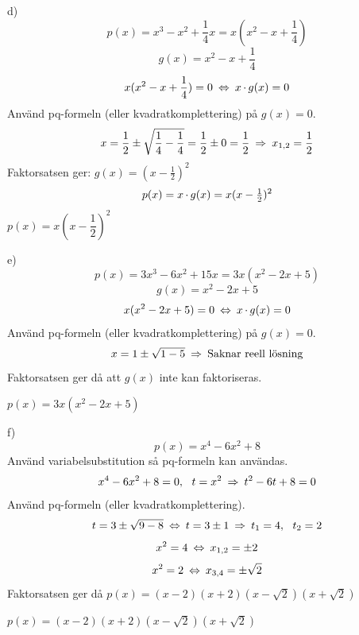 \begin{task}{d)}
	\[p(x)=x^3-x^2+\frac{1}{4}x=x\left(x^2-x+\frac{1}{4}\right)\]
	\[g(x)=x^2-x+\frac{1}{4}\]
	\[x(x^2-x+\frac{1}{4})=0 \lra x\*g(x)=0\]
	Använd pq-formeln (eller kvadratkomplettering) på $g(x)=0$.
	\[x=\frac{1}{2}\pm\sqrt{\frac{1}{4}-\frac{1}{4}}=
	\frac{1}{2}\pm 0=
	\frac{1}{2}
	\ra x_{1,2}=\frac{1}{2}\]
	Faktorsatsen ger: $g(x)=(x-\frac{1}{2})^2$
	\[p(x)=x\operatorname{\cdot}g(x)=x(x-\tfrac{1}{2})^2\]
	\ans $p(x)=x\left(x-\dfrac{1}{2}\right)^2$
\end{task}

\begin{task}{e)}
	\[p(x)=3x^3-6x^2+15x=3x(x^2-2x+5)\]
	\[g(x)=x^2-2x+5\]
	\[x(x^2-2x+5)=0 \lra x\*g(x)=0\]
	Använd pq-formeln (eller kvadratkomplettering) på $g(x)=0$.
	\[x=1\pm\sqrt{1-5} \ra \text{Saknar reell lösning}\]
	Faktorsatsen ger då att $g(x)$ inte kan faktoriseras.
	
	\ans $p(x)=3x(x^2-2x+5)$
\end{task}

\begin{task}{f)}
	\[p(x)=x^4-6x^2+8\]
	Använd variabelsubstitution så pq-formeln kan användas.
	\[x^4-6x^2+8=0,~~t=x^2 \ra t^2-6t+8=0\]
	Använd pq-formeln (eller kvadratkomplettering).
	\[t=3\pm\sqrt{9-8} \lra t=3\pm 1 \ra t_1=4,~~t_2=2\]
	\[x^2=4 \lra x_{1,2}=\pm 2\]
	\[x^2=2 \lra x_{3,4}=\pm \sqrt{2}\]
	Faktorsatsen ger då $p(x)=(x-2)(x+2)(x-\sqrt{2})(x+\sqrt{2})$
	
	\ans $p(x)=(x-2)(x+2)(x-\sqrt{2})(x+\sqrt{2})$
\end{task}

